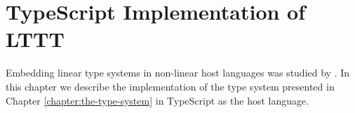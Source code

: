 \chapter{TypeScript Implementation of LTTT}
\label{chap:typescript-implementation}

Embedding linear type systems in non-linear host languages was studied by \cite{JenniferPaykin2018}. In this chapter we describe the implementation of the type system presented in Chapter \ref{chapter:the-type-system} in TypeScript as the host language.

